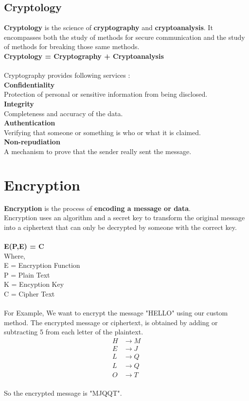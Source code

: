 \documentclass[11pt]{article}
\begin{document}
\subsection*{Cryptology}
\textbf{Cryptology} is the science of \textbf{cryptography} and \textbf{cryptoanalysis}. It encompasses both the study of methods for secure communication and the study of methods for breaking those same methods. \\
\textbf{Cryptology = Cryptography + Cryptoanalysis} 
\\ \\
Cryptography provides following services : \\
\textbf{Confidentiality} \\
Protection of personal or sensitive information from being disclosed. \\
\textbf{Integrity} \\
Completeness and accuracy of the data. \\
\textbf{Authentication} \\
Verifying that someone or something is who or what it is claimed. \\
\textbf{Non-repudiation} \\
A mechanism to prove that the sender really sent the message.

\section*{Encryption}
\textbf{Encryption} is the process of \textbf{encoding a message or data}. \\
Encryption uses an algorithm and a secret key to transform the original message into a ciphertext that can only be decrypted by someone with the correct key.
\\ \\ 
\textbf{ E(P,E) = C} \\
Where, \\
E = Encryption Function \\
P = Plain Text \\
K = Encyption Key \\
C = Cipher Text \\
\\
For Example, We want to encrypt the message "HELLO" using our custom method. The encrypted message or ciphertext, is obtained by adding or subtracting 5 from each letter of the plaintext.
\begin{align*}
H &\rightarrow M \\
E &\rightarrow J \\
L &\rightarrow Q \\
L &\rightarrow Q \\
O &\rightarrow T
\end{align*}
\\
So the encrypted message is "MJQQT".
\end{document}
